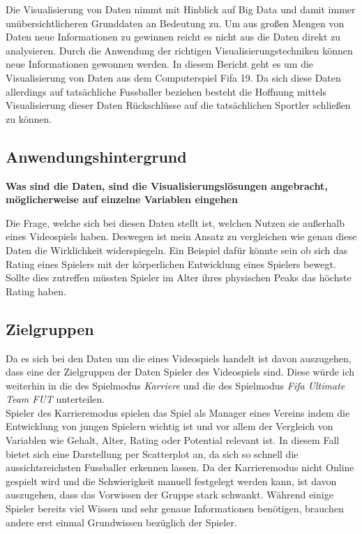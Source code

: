 \documentclass[usegeometry=true]{scrartcl}
\begin{document}
Die Visualisierung von Daten nimmt mit Hinblick auf Big Data und damit immer unübersichtlicheren Grunddaten an Bedeutung zu. Um aus großen Mengen von Daten neue Informationen zu gewinnen reicht es nicht aus die Daten direkt zu analysieren. Durch die Anwendung der richtigen Visualisierungstechniken können neue Informationen gewonnen werden. In diesem Bericht geht es um die Visualisierung von Daten aus dem Computerspiel Fifa 19. Da sich diese Daten allerdings auf tatsächliche Fussballer beziehen besteht die Hoffnung mittels Visualisierung dieser Daten Rückschlüsse auf die tatsächlichen Sportler schließen zu können.


\subsection{Anwendungshintergrund}
\textbf{Was sind die Daten, sind die Visualisierungslösungen angebracht, möglicherweise auf einzelne Variablen eingehen}\cite{Munzner2008}


Die Frage, welche sich bei diesen Daten stellt ist, welchen Nutzen sie außerhalb eines Videospiels haben. Deswegen ist mein Ansatz zu vergleichen wie genau diese Daten die Wirklichkeit widerspiegeln. Ein Beispiel dafür könnte sein ob sich das Rating eines Spielers mit der körperlichen Entwicklung eines Spielers bewegt. Sollte dies zutreffen  müssten Spieler im Alter ihres physischen Peaks das höchste Rating haben. 
\subsection{Zielgruppen}
Da es sich bei den Daten um die eines Videospiels handelt ist davon auszugehen, dass eine der Zielgruppen der Daten Spieler des Videospiels sind. Diese würde ich weiterhin in die des Spielmodus \textit{Karriere} und die des Spielmodus \textit{Fifa Ultimate Team  FUT} unterteilen.\\

Spieler des Karrieremodus spielen das Spiel als Manager eines Vereins indem die Entwicklung von jungen Spielern wichtig ist und vor allem der Vergleich von Variablen wie Gehalt, Alter, Rating oder Potential relevant ist. In diesem Fall bietet sich eine Darstellung per Scatterplot an, da sich so schnell die aussichtsreichsten Fussballer erkennen lassen. Da der Karrieremodus nicht Online gespielt wird und die Schwierigkeit manuell festgelegt werden kann, ist davon auszugehen, dass das Vorwissen der Gruppe stark schwankt. Während einige Spieler bereits viel Wissen und sehr genaue Informationen benötigen, brauchen andere erst einmal Grundwissen bezüglich der Spieler.
\end{document}
